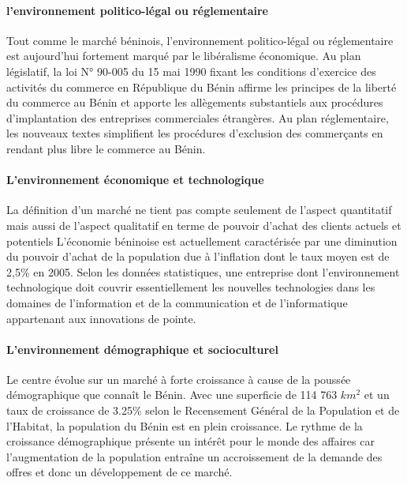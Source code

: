 \paragraph{l'environnement politico-légal ou réglementaire} 
Tout comme le marché béninois, l'environnement politico-légal ou réglementaire est aujourd'hui 
fortement marqué par le libéralisme économique.
Au plan législatif, la loi N° 90-005 du 15 mai 1990 fixant les conditions d'exercice des
activités du commerce en République du Bénin affirme les principes de la liberté du 
commerce au Bénin et apporte les allègements substantiels aux procédures d'implantation 
des entreprises commerciales étrangères. 
Au plan réglementaire, les nouveaux textes simplifient les procédures d'exclusion des 
commerçants en rendant plus libre le commerce au Bénin.


\paragraph{L'environnement économique et technologique} 
La définition d'un marché ne tient pas compte seulement de l'aspect quantitatif mais aussi de l'aspect 
qualitatif en terme de pouvoir d'achat des clients actuels et potentiels L'économie béninoise est
actuellement caractérisée par une diminution du pouvoir d'achat de la population due à l'inflation
dont le taux moyen est de 2,5\% en 2005. Selon les données statistiques, une entreprise dont 
l'environnement technologique doit couvrir essentiellement les nouvelles technologies dans les domaines 
de l'information et de la communication et de l'informatique appartenant aux innovations de pointe.


\paragraph{L'environnement démographique et socioculturel} 
Le centre évolue sur un marché à forte croissance à cause de la poussée démographique que connaît le 
Bénin. Avec une superficie de 114 763 $km^2$ et un taux de croissance de 3.25\% selon le Recensement 
Général de la Population et de l'Habitat, la population du Bénin est en plein croissance. Le rythme 
de la croissance démographique présente un intérêt pour le monde des affaires car l'augmentation de 
la population entraîne un accroissement de la demande des offres et donc un développement de ce marché.



